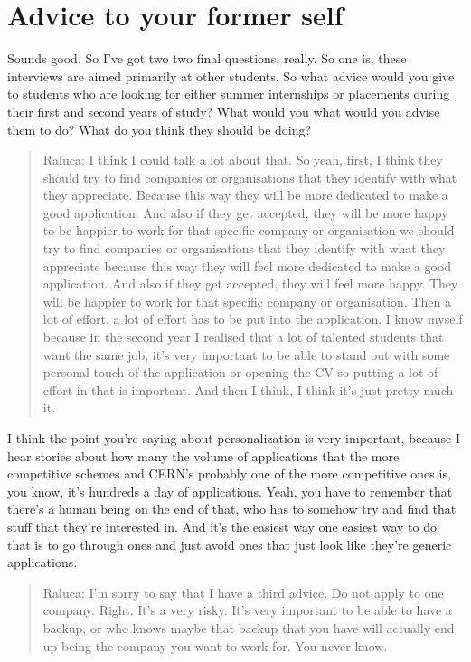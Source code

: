 \documentclass[
]{book}
\begin{document}
\hypertarget{rselfie}{%
\section{Advice to your former self}\label{rselfie}}

Sounds good. So I've got two two final questions, really. So one is, these interviews are aimed primarily at other students. So what advice would you give to students who are looking for either summer internships or placements during their first and second years of study? What would you what would you advise them to do? What do you think they should be doing?

\begin{quote}
Raluca: I think I could talk a lot about that. So yeah, first, I think they should try to find companies or organisations that they identify with what they appreciate. Because this way they will be more dedicated to make a good application. And also if they get accepted, they will be more happy to be happier to work for that specific company or organisation we should try to find companies or organisations that they identify with what they appreciate because this way they will feel more dedicated to make a good application. And also if they get accepted, they will feel more happy. They will be happier to work for that specific company or organisation. Then a lot of effort, a lot of effort has to be put into the application. I know myself because in the second year I realised that a lot of talented students that want the same job, it's very important to be able to stand out with some personal touch of the application or opening the CV so putting a lot of effort in that is important. And then I think, I think it's just pretty much it.
\end{quote}

I think the point you're saying about personalization is very important, because I hear stories about how many the volume of applications that the more competitive schemes and CERN's probably one of the more competitive ones is, you know, it's hundreds a day of applications. Yeah, you have to remember that there's a human being on the end of that, who has to somehow try and find that stuff that they're interested in. And it's the easiest way one easiest way to do that is to go through ones and just avoid ones that just look like they're generic applications.

\begin{quote}
Raluca: I'm sorry to say that I have a third advice. Do not apply to one company. Right. It's a very risky. It's very important to be able to have a backup, or who knows maybe that backup that you have will actually end up being the company you want to work for. You never know.
\end{quote}
\end{document}

